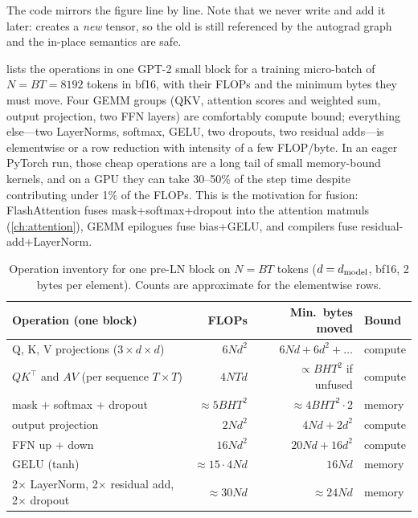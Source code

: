 The code mirrors the figure line by line. Note that we never write  and add it
later:  creates a \emph{new} tensor, so the old  is still referenced by
the autograd graph and the in-place semantics are safe.

\begin{systemslens}
 lists the operations in one GPT-2 small block for a training micro-batch of
$N=BT=8192$ tokens in bf16, with their FLOPs and the minimum bytes they must move. Four GEMM groups
(QKV, attention scores and weighted sum, output projection, two FFN layers) are comfortably compute
bound; everything else---two LayerNorms, softmax, GELU, two dropouts, two residual adds---is
elementwise or a row reduction with intensity of a few FLOP/byte. In an eager PyTorch run, those
cheap operations are a long tail of small memory-bound kernels, and on a GPU they can take 30--50\% of
the step time despite contributing under 1\% of the FLOPs. This is the motivation for fusion:
FlashAttention fuses mask+softmax+dropout into the attention matmuls (\cref{ch:attention}),
GEMM epilogues fuse bias+GELU, and compilers fuse residual-add+LayerNorm.
\end{systemslens}

\begin{table}[t]
\centering\small
\begin{tabular}{lrrl}
\toprule
Operation (one block) & FLOPs & Min.\ bytes moved & Bound\\
\midrule
Q, K, V projections ($3\times d\!\times\! d$) & $6Nd^2$ & $6Nd+6d^2+\ldots$ & compute\\
$QK^\top$ and $AV$ (per sequence $T\times T$) & $4NTd$ & $\propto BHT^2$ if unfused & compute\\
mask $+$ softmax $+$ dropout & $\approx 5BHT^2$ & $\approx 4BHT^2\cdot 2$ & memory\\
output projection & $2Nd^2$ & $4Nd+2d^2$ & compute\\
FFN up $+$ down & $16Nd^2$ & $20Nd+16d^2$ & compute\\
GELU (tanh) & $\approx 15\cdot 4Nd$ & $16Nd$ & memory\\
2$\times$ LayerNorm, 2$\times$ residual add, 2$\times$ dropout & $\approx 30Nd$ & $\approx 24Nd$ & memory\\
\bottomrule
\end{tabular}
\caption{Operation inventory for one pre-LN block on $N=BT$ tokens ($d=d_{\text{model}}$, bf16, 2 bytes per
element). Counts are approximate for the elementwise rows.}
\label{tab:gpt:blockops}
\end{table}

